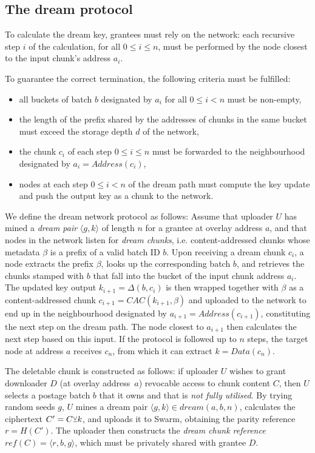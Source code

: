 \documentclass[singlecolumn]{acmart}
\newcommand\xor{\text{\small$\veebar$}}
\begin{document}
\subsection{The dream protocol}
 
To calculate the dream key, grantees must rely on the network: each recursive step $i$ of the calculation, for all $0\le i\le n$, must be performed by the node closest to the input chunk's address $a_{i}$. 

To guarantee the correct termination, the following criteria must be fulfilled:
\begin{itemize}[noitemsep]
\item[---] all buckets of batch $b$ designated by $a_i$ for all $0\le i< n$ must be non-empty,
\item[---] the length of the prefix shared by the addresses of chunks in the same bucket must exceed the storage depth $d$ of the network,
\item[---] the chunk $c_{i}$ of each step $0\le i\le n$ must be forwarded to the neighbourhood designated by  $a_{i}=\mathit{Address}(c_{i})$,
\item[---] nodes at each step $0\le i<n$ of the dream path must compute the key update and push the output key as a chunk to the network.
\end{itemize}


We define the dream network protocol as follows: Assume that uploader $U$ has mined a \textit{dream pair} $\langle g,k\rangle$ of length $n$ for a grantee at overlay address $a$, and that nodes in the network listen for \emph{dream chunks}, i.e. content-addressed chunks whose metadata $\beta$ is a prefix of a valid batch ID $b$. Upon receiving a dream chunk $c_{i}$, a node extracts the prefix $\beta$, looks up the corresponding batch $b$, and retrieves the chunks stamped with $b$ that fall into the bucket of the input chunk address $a_{i}$. The updated key output $k_{i+1}=\Delta(b,c_i)$ is then wrapped together with $\beta$ as a content-addressed chunk $c_{i+1}=\mathit{CAC}(k_{i+1},\beta)$ and uploaded to the network to end up in the neighbourhood designated by $a_{i+1}=\mathit{Address}(c_{i+1})$, constituting the next step on the dream path. The node closest to $a_{i+1}$  then calculates the next step based on this input. If the protocol is followed up to $n$ steps,  the target node at address $a$ receives $c_{n}$, from which it can extract $k=\mathit{Data}(c_{n})$.

The deletable chunk is constructed as follows: if uploader $U$ wishes to grant downloader $D$ (at overlay address~$a$) revocable access to chunk content $C$, then $U$ selects a postage batch $b$ that it owns and that is \emph{not fully utilised}.
By trying random seeds $g$, $U$ mines a dream pair $\langle g, k\rangle\in\mathit{dream}(a,b,n)$,
calculates the ciphertext $C'=C \xor k$, and uploads it to Swarm, obtaining the parity reference $r=\mathit{H}(C')$. The uploader then constructs the \emph{dream chunk reference} $\mathit{ref}(C)=\langle r,b,g \rangle $, which must be privately shared with grantee $D$.
\end{document}
